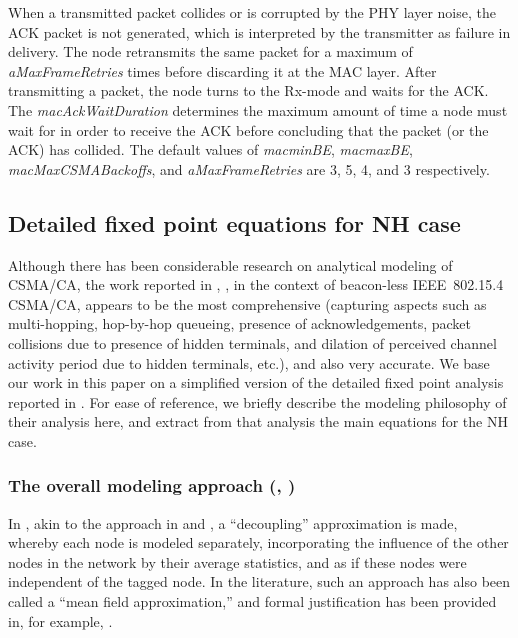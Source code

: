 \documentclass[12pt, draftclsnofoot, onecolumn]{IEEEtran}
\begin{document}
When a transmitted packet collides or is corrupted by the PHY layer noise, the ACK packet is not generated, which is interpreted by the transmitter as failure in delivery. The node retransmits the same packet for a maximum of \emph{aMaxFrameRetries} times before discarding it at the MAC layer. After transmitting a packet, the node turns to the Rx-mode and waits for the ACK.  The \emph{macAckWaitDuration} determines the maximum amount of time a node must wait for in order to receive the ACK before concluding that the packet (or the ACK) has collided. The default values of \emph{macminBE}, \emph{macmaxBE}, \emph{macMaxCSMABackoffs}, and \emph{aMaxFrameRetries} are 3, 5, 4, and 3 respectively.

\subsection{Detailed fixed point equations for NH case}
\label{subsec:full-analysis}
Although there has been considerable research on analytical modeling of CSMA/CA, the work reported in \cite{rachitpaper}, \cite{srivastava}, in the context of beacon-less IEEE~802.15.4 CSMA/CA, appears to be the most comprehensive (capturing aspects such as multi-hopping, hop-by-hop queueing, presence of acknowledgements, packet collisions due to presence of hidden terminals, and dilation of perceived channel activity period due to hidden terminals, etc.), and also very accurate. We base our work in this paper on a simplified version of the detailed fixed point analysis reported in \cite{rachitpaper,srivastava}. For ease of reference, we briefly describe the modeling philosophy of their analysis here, and extract from that analysis the main equations for the NH case.

\subsubsection{The overall modeling approach (\cite{rachitpaper}, \cite{srivastava})}

In \cite{rachitpaper, srivastava}, akin to the approach in \cite{bianchi00performance} and \cite{kumar-etal04new-insights}, a ``decoupling'' approximation is made, whereby each node is modeled separately, incorporating the influence of the other nodes in the network by their average statistics, and as if these nodes were independent of the tagged node. In the literature, such an approach has also been called a ``mean field approximation,'' and formal justification has been provided in, for example, \cite{bordenave}.
\end{document}
